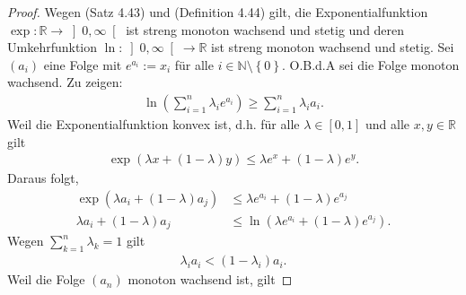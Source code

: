 \documentclass[12pt]{extarticle}
\newcommand{\mg}[1]{\mathbb{#1}}
\begin{document}
\begin{proof}
  Wegen (Satz 4.43) und (Definition 4.44) gilt, die
  Exponentialfunktion
  \(\exp \colon \mg{R} \to \left] 0 , \infty \right[\)
  ist streng monoton wachsend und stetig und deren
  Umkehrfunktion
  \(\ln \colon \left]0, \infty\right[ \to \mg{R}\) ist
  streng monoton wachsend und stetig.  Sei \((a_i)\) eine
  Folge mit \(e^{a_i}:=x_i\) für alle
  \(i \in \mg{N} \setminus \left\{ 0 \right\}\).  O.B.d.A
  sei die Folge monoton wachsend.  Zu zeigen:
\begin{align*}
  \ln \left( \sum_{i=1}^n{\lambda_ie^{a_i}} \right) \ge
  \sum_{i=1}^n{\lambda_ia_i}.
\end{align*}
  Weil die Exponentialfunktion konvex ist, d.h. für
  alle \(\lambda \in \left[0, 1\right]\) und alle $x, y
  \in \mg{R}$ gilt
\begin{align*}
  \exp(\lambda x + (1-\lambda) y)
  \le \lambda e^x + (1-\lambda)e^y.
\end{align*}
Daraus folgt,
\begin{align*}
  \exp(\lambda a_i + (1-\lambda) a_j)
  &\le \lambda e^{a_i} + (1-\lambda)e^{a_j} \\
  \lambda a_i + (1-\lambda) a_j
  &\le \ln \left( \lambda e^{a_i} + (1-\lambda)e^{a_j}  \right).
\end{align*}
Wegen  \(\sum_{k=1}^n{\lambda_k} = 1\) gilt
\begin{align*}
  \lambda_i a_i < (1-\lambda_i) a_i.
\end{align*}
Weil die Folge \((a_n)\) monoton wachsend ist, gilt
\end{proof}
\end{document}
